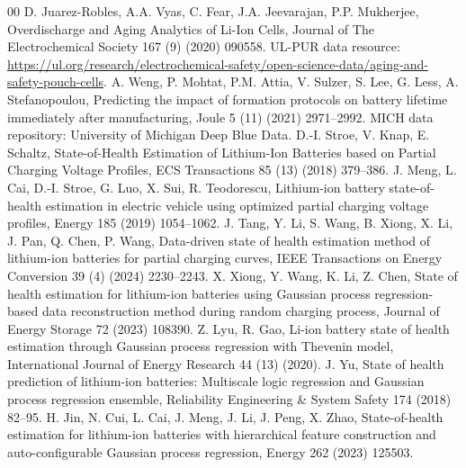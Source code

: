 \begin{thebibliography}{00}
 D. Juarez-Robles, A.A. Vyas, C. Fear, J.A. Jeevarajan, P.P. Mukherjee, Overdischarge and Aging Analytics of Li-Ion Cells, Journal of The Electrochemical Society 167 (9) (2020) 090558. UL-PUR data resource: \url{https://ul.org/research/electrochemical-safety/open-science-data/aging-and-safety-pouch-cells}.
 A. Weng, P. Mohtat, P.M. Attia, V. Sulzer, S. Lee, G. Less, A. Stefanopoulou, Predicting the impact of formation protocols on battery lifetime immediately after manufacturing, Joule 5 (11) (2021) 2971--2992. MICH data repository: University of Michigan Deep Blue Data.
 D.-I. Stroe, V. Knap, E. Schaltz, State-of-Health Estimation of Lithium-Ion Batteries based on Partial Charging Voltage Profiles, ECS Transactions 85 (13) (2018) 379--386.
 J. Meng, L. Cai, D.-I. Stroe, G. Luo, X. Sui, R. Teodorescu, Lithium-ion battery state-of-health estimation in electric vehicle using optimized partial charging voltage profiles, Energy 185 (2019) 1054--1062.
 J. Tang, Y. Li, S. Wang, B. Xiong, X. Li, J. Pan, Q. Chen, P. Wang, Data-driven state of health estimation method of lithium-ion batteries for partial charging curves, IEEE Transactions on Energy Conversion 39 (4) (2024) 2230--2243.
 X. Xiong, Y. Wang, K. Li, Z. Chen, State of health estimation for lithium-ion batteries using Gaussian process regression-based data reconstruction method during random charging process, Journal of Energy Storage 72 (2023) 108390.
 Z. Lyu, R. Gao, Li-ion battery state of health estimation through Gaussian process regression with Thevenin model, International Journal of Energy Research 44 (13) (2020).
 J. Yu, State of health prediction of lithium-ion batteries: Multiscale logic regression and Gaussian process regression ensemble, Reliability Engineering \& System Safety 174 (2018) 82--95.
 H. Jin, N. Cui, L. Cai, J. Meng, J. Li, J. Peng, X. Zhao, State-of-health estimation for lithium-ion batteries with hierarchical feature construction and auto-configurable Gaussian process regression, Energy 262 (2023) 125503.
\end{thebibliography}
